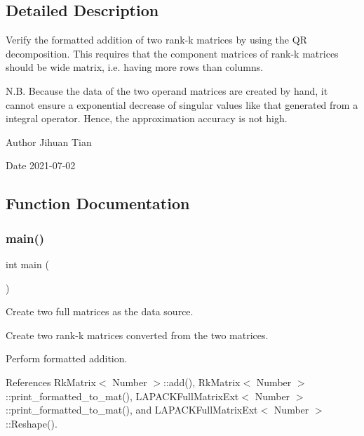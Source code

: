 \subsection{Detailed Description}
Verify the formatted addition of two rank-\/k matrices by using the QR decomposition. This requires that the component matrices of rank-\/k matrices should be wide matrix, i.\+e. having more rows than columns. 

N.\+B. Because the data of the two operand matrices are created by hand, it cannot ensure a exponential decrease of singular values like that generated from a integral operator. Hence, the approximation accuracy is not high.

\begin{DoxyAuthor}{Author}
Jihuan Tian 
\end{DoxyAuthor}
\begin{DoxyDate}{Date}
2021-\/07-\/02 
\end{DoxyDate}


\subsection{Function Documentation}
\mbox{\label{rkmatrix-add-formatted-using-qr_8cc_ae66f6b31b5ad750f1fe042a706a4e3d4}} 
\subsubsection{\texorpdfstring{main()}{main()}}
{\footnotesize\ttfamily int main (\begin{DoxyParamCaption}{ }\end{DoxyParamCaption})}

Create two full matrices as the data source.

Create two rank-\/k matrices converted from the two matrices.

Perform formatted addition.

References Rk\+Matrix$<$ Number $>$\+::add(), Rk\+Matrix$<$ Number $>$\+::print\+\_\+formatted\+\_\+to\+\_\+mat(), L\+A\+P\+A\+C\+K\+Full\+Matrix\+Ext$<$ Number $>$\+::print\+\_\+formatted\+\_\+to\+\_\+mat(), and L\+A\+P\+A\+C\+K\+Full\+Matrix\+Ext$<$ Number $>$\+::\+Reshape().

